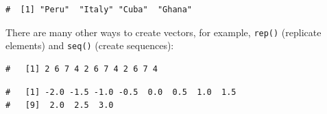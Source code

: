 \documentclass[a4paper,9pt,twocolumn,twoside,printwatermark=false]{pinp}
\begin{document}
\begin{Shaded}
\begin{Highlighting}[]
\StringTok{ }\NormalTok{(}\NormalTok{, }\NormalTok{, }\NormalTok{, }\NormalTok{)  }
\end{Highlighting}
\end{Shaded}

\begin{ShadedResult}
\begin{verbatim}
#  [1] "Peru"  "Italy" "Cuba"  "Ghana"
\end{verbatim}
\end{ShadedResult}

There are many other ways to create vectors, for example, \texttt{rep()}
(replicate elements) and \texttt{seq()} (create sequences):

\begin{Shaded}
\begin{Highlighting}[]
\StringTok{ }\NormalTok{(}\NormalTok{(}\NormalTok{, }\NormalTok{, }\NormalTok{, }\NormalTok{), }\NormalTok{)}
\end{Highlighting}
\end{Shaded}

\begin{ShadedResult}
\begin{verbatim}
#   [1] 2 6 7 4 2 6 7 4 2 6 7 4
\end{verbatim}
\end{ShadedResult}

\begin{Shaded}
\begin{Highlighting}[]
\StringTok{ }\NormalTok{(}\OperatorTok{-}\NormalTok{, }\NormalTok{, }\NormalTok{)}
\end{Highlighting}
\end{Shaded}

\begin{ShadedResult}
\begin{verbatim}
#   [1] -2.0 -1.5 -1.0 -0.5  0.0  0.5  1.0  1.5
#   [9]  2.0  2.5  3.0
\end{verbatim}
\end{ShadedResult}
\end{document}
